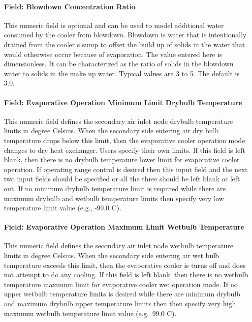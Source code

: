 \paragraph{Field: Blowdown Concentration Ratio}\label{field-blowdown-concentration-ratio-2-000}

This numeric field is optional and can be used to model additional water consumed by the cooler from blowdown. Blowdown is water that is intentionally drained from the cooler s sump to offset the build up of solids in the water that would otherwise occur because of evaporation. The value entered here is dimensionless. It can be characterized as the ratio of solids in the blowdown water to solids in the make up water. Typical values are 3 to 5. The default is 3.0.

\paragraph{Field: Evaporative Operation Minimum Limit Drybulb Temperature}\label{field-evaporative-operation-minimum-limit-drybulb-temperature}

This numeric field defines the secondary air inlet node drybulb temperature limits in degree Celsius. When the secondary side entering air dry bulb temperature drops below this limit, then the evaporative cooler operation mode changes to dry heat exchanger. Users specify their own limits. If this field is left blank, then there is no drybulb temperature lower limit for evaporative cooler operation. If operating range control is desired then this input field and the next two input fields should be specified or all the three should be left blank or left out. If no minimum drybulb temperature limit is required while there are maximum drybulb and wetbulb temperature limits then specify very low temperature limit value (e.g., -99.0 C).

\paragraph{Field: Evaporative Operation Maximum Limit Wetbulb Temperature}\label{field-evaporative-operation-maximum-limit-wetbulb-temperature-1}

This numeric field defines the secondary air inlet node wetbulb temperature limits in degree Celsius. When the secondary side entering air wet bulb temperature exceeds this limit, then the evaporative cooler is turns off and does not attempt to do any cooling. If this field is left blank, then there is no wetbulb temperature maximum limit for evaporative cooler wet operation mode. If no upper wetbulb temperature limits is desired while there are minimum drybulb and maximum drybulb upper temperature limits then then specify very high maximum wetbulb temperature limit value (e.g.~99.0 C).

